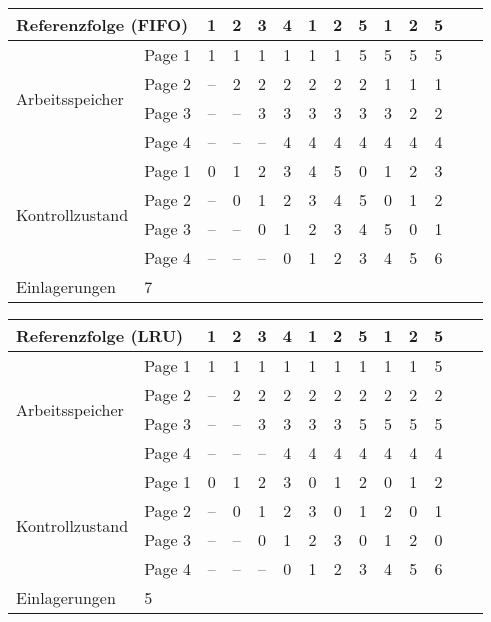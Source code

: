 \documentclass{article}
\begin{document}
\begin{tabular}{|l|l|c|c|c|c|c|c|c|c|c|c|c|c|}
\hline
\multicolumn{2}{|l|}{Referenzfolge (FIFO) } & 1 & 2 & 3 & 4 & 1 & 2 & 5 & 1 & 2 & 
5 \\
\hline
\multirow{4}{*}{Arbeitsspeicher} & Page 1 & 1 & 1 & 1 & 1 & 1 & 1 & 5 & 5 & 5 & 
5 \\
 & Page 2 & -- & 2 & 2 & 2 & 2 & 2 & 2 & 1 & 1 & 1 \\
 & Page 3 & -- & -- & 3 & 3 & 3 & 3 & 3 & 3 & 2 & 2 \\
 & Page 4 & -- & -- & -- & 4 & 4 & 4 & 4 & 4 & 4 & 4 \\
\hline
\multirow{4}{*}{Kontrollzustand} & Page 1 & 0 & 1 & 2 & 3 & 4 & 5 & 0 & 1 & 2 & 
3 \\
 & Page 2 & -- & 0 & 1 & 2 & 3 & 4 & 5 & 0 & 1 & 2 \\
 & Page 3 & -- & -- & 0 & 1 & 2 & 3 & 4 & 5 & 0 & 1 \\
 & Page 4 & -- & -- & -- & 0 & 1 & 2 & 3 & 4 & 5 & 6 \\
\hline
Einlagerungen & \multicolumn{11}{|l|}{7} \\
\hline
\end{tabular}

\begin{tabular}{|l|l|c|c|c|c|c|c|c|c|c|c|c|c|}
\hline
\multicolumn{2}{|l|}{Referenzfolge (LRU) } & 1 & 2 & 3 & 4 & 1 & 2 & 5 & 1 & 2 & 
5 \\
\hline
\multirow{4}{*}{Arbeitsspeicher} & Page 1 & 1 & 1 & 1 & 1 & 1 & 1 & 1 & 1 & 1 & 
5 \\
 & Page 2 & -- & 2 & 2 & 2 & 2 & 2 & 2 & 2 & 2 & 2 \\
 & Page 3 & -- & -- & 3 & 3 & 3 & 3 & 5 & 5 & 5 & 5 \\
 & Page 4 & -- & -- & -- & 4 & 4 & 4 & 4 & 4 & 4 & 4 \\
\hline
\multirow{4}{*}{Kontrollzustand} & Page 1 & 0 & 1 & 2 & 3 & 0 & 1 & 2 & 0 & 1 & 
2 \\
 & Page 2 & -- & 0 & 1 & 2 & 3 & 0 & 1 & 2 & 0 & 1 \\
 & Page 3 & -- & -- & 0 & 1 & 2 & 3 & 0 & 1 & 2 & 0 \\
 & Page 4 & -- & -- & -- & 0 & 1 & 2 & 3 & 4 & 5 & 6 \\
\hline
Einlagerungen & \multicolumn{11}{|l|}{5} \\
\hline
\end{tabular}
\end{document}
